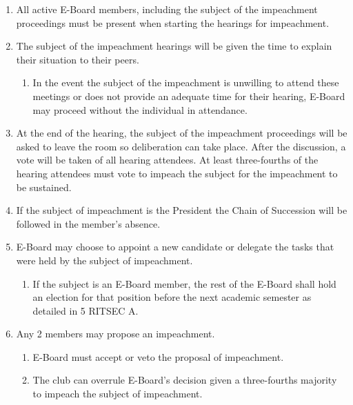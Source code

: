 


\begin{enumerate}
  \item All active E-Board members, including the subject of the impeachment
    proceedings must be present when starting the hearings for impeachment.
  \item The subject of the impeachment hearings will be given the time to
    explain their situation to their peers.
  \begin{enumerate}
    \item In the event the subject of the impeachment is unwilling to attend
      these meetings or does not provide an adequate time for their hearing,
      E-Board may proceed without the individual in attendance.
  \end{enumerate}
  \item At the end of the hearing, the subject of the impeachment proceedings
    will be asked to leave the room so deliberation can take place. After the
    discussion, a vote will be taken of all hearing attendees. At least
    three-fourths of the hearing attendees must vote to impeach the subject for
    the impeachment to be sustained.
  \item If the subject of impeachment is the President the Chain of Succession
    will be followed in the member’s absence.
  \item E-Board may choose to appoint a new candidate or delegate the tasks
    that were held by the subject of impeachment.
  \begin{enumerate}
    \item If the subject is an E-Board member, the rest of the E-Board shall
      hold an election for that position before the next academic semester as
      detailed in 5 RITSEC A.
  \end{enumerate}
  \item Any 2 members may propose an impeachment.
  \begin{enumerate}
    \item E-Board must accept or veto the proposal of impeachment.
    \item The club can overrule E-Board's decision given a three-fourths
      majority to impeach the subject of impeachment.
  \end{enumerate}
\end{enumerate}

